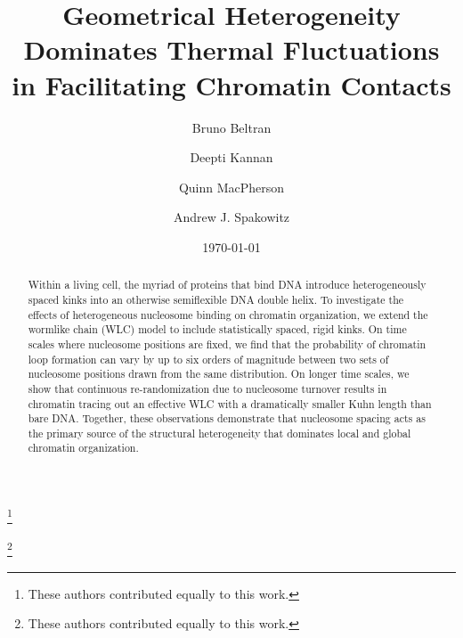 \documentclass[%
 reprint,
superscriptaddress,
showpacs,preprintnumbers,
 amsmath,amssymb,
 aps,
 prl,
floatfix,
]{revtex4-1}
\begin{document}
\title{Geometrical Heterogeneity Dominates
Thermal Fluctuations in {\color{red} Facilitating Chromatin Contacts}}%
\author{Bruno Beltran}%
\thanks{These authors contributed equally to this work.}%
%
\author{Deepti Kannan}%
\thanks{These authors contributed equally to this work.}%
\author{Quinn MacPherson}%
%
\author{Andrew J. Spakowitz}%
%
%
%
%
\date{\today}%

\begin{abstract}
Within a living cell, the myriad of proteins that bind DNA introduce heterogeneously spaced kinks into an otherwise semiflexible DNA double helix.
To investigate the effects of heterogeneous nucleosome binding on chromatin organization, we extend the wormlike chain (WLC) model to include statistically spaced, rigid kinks.
On time scales where nucleosome positions are fixed, we find that the probability of chromatin loop formation can vary by up to six orders of magnitude between two sets of nucleosome positions drawn from the same distribution.
On longer time scales, we show that continuous re-randomization due to nucleosome turnover results in chromatin tracing out an effective WLC with a dramatically smaller Kuhn length than bare DNA.
Together, these observations {\color{red} demonstrate that nucleosome spacing
    acts as the primary source of the structural heterogeneity that dominates local and global chromatin organization.}
\end{abstract}

\maketitle
\end{document}
